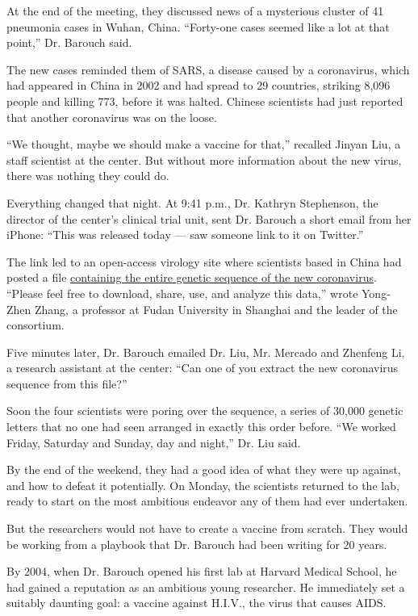 At the end of the meeting, they discussed news of a mysterious cluster
of 41 pneumonia cases in Wuhan, China. ``Forty-one cases seemed like a
lot at that point,'' Dr. Barouch said.

The new cases reminded them of SARS, a disease caused by a coronavirus,
which had appeared in China in 2002 and had spread to 29 countries,
striking 8,096 people and killing 773, before it was halted. Chinese
scientists had just reported that another coronavirus was on the loose.

``We thought, maybe we should make a vaccine for that,'' recalled Jinyan
Liu, a staff scientist at the center. But without more information about
the new virus, there was nothing they could do.

Everything changed that night. At 9:41 p.m., Dr. Kathryn Stephenson, the
director of the center's clinical trial unit, sent Dr. Barouch a short
email from her iPhone: ``This was released today --- saw someone link to
it on Twitter.''

The link led to an open-access virology site where scientists based in
China had posted a file
\href{https://virological.org/t/novel-2019-coronavirus-genome/319}{containing
the entire genetic sequence of the new coronavirus}. ``Please feel free
to download, share, use, and analyze this data,'' wrote Yong-Zhen Zhang,
a professor at Fudan University in Shanghai and the leader of the
consortium.

Five minutes later, Dr. Barouch emailed Dr. Liu, Mr. Mercado and
Zhenfeng Li, a research assistant at the center: ``Can one of you
extract the new coronavirus sequence from this file?''

Soon the four scientists were poring over the sequence, a series of
30,000 genetic letters that no one had seen arranged in exactly this
order before. ``We worked Friday, Saturday and Sunday, day and night,''
Dr. Liu said.

By the end of the weekend, they had a good idea of what they were up
against, and how to defeat it potentially. On Monday, the scientists
returned to the lab, ready to start on the most ambitious endeavor any
of them had ever undertaken.

But the researchers would not have to create a vaccine from scratch.
They would be working from a playbook that Dr. Barouch had been writing
for 20 years.

By 2004, when Dr. Barouch opened his first lab at Harvard Medical
School, he had gained a reputation as an ambitious young researcher. He
immediately set a suitably daunting goal: a vaccine against H.I.V., the
virus that causes AIDS.

